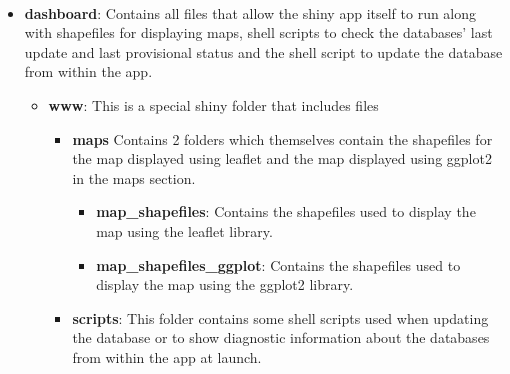 \documentclass[
  a4paper]{article}
\providecommand{\tightlist}{%
  \setlength{\itemsep}{0pt}\setlength{\parskip}{0pt}}
\begin{document}
~

\begin{itemize}
\tightlist
\item
  \textcolor{darkspringgreen}{\textbf{dashboard}}: Contains all files
  that allow the shiny app itself to run along with shapefiles for
  displaying maps, shell scripts to check the databases' last update and
  last provisional status and the shell script to update the database
  from within the app.

  \begin{itemize}
  \tightlist
  \item
    \textcolor{darkspringgreen}{\textbf{www}}: This is a special shiny
    folder that includes files

    \begin{itemize}
    \tightlist
    \item
      \textcolor{darkspringgreen}{\textbf{maps}} Contains 2 folders
      which themselves contain the shapefiles for the map displayed
      using leaflet and the map displayed using ggplot2 in the maps
      section.

      \begin{itemize}
      \tightlist
      \item
        \textcolor{darkspringgreen}{\textbf{map\_shapefiles}}: Contains
        the shapefiles used to display the map using the leaflet
        library.
      \item
        \textcolor{darkspringgreen}{\textbf{map\_shapefiles\_ggplot}}:
        Contains the shapefiles used to display the map using the
        ggplot2 library.
      \end{itemize}
    \item
      \textcolor{darkspringgreen}{\textbf{scripts}}: This folder
      contains some shell scripts used when updating the database or to
      show diagnostic information about the databases from within the
      app at launch.


\end{itemize}
\end{itemize}
\end{itemize}
\end{document}
